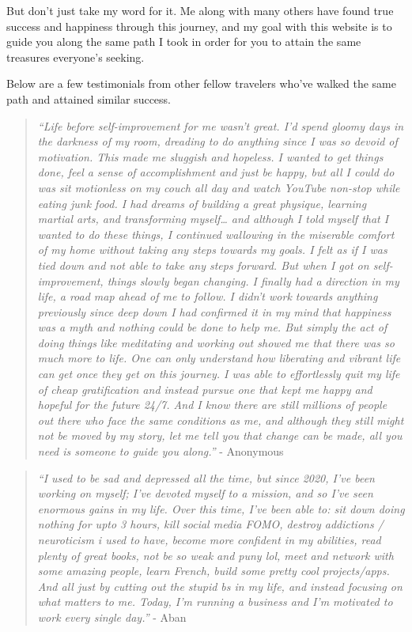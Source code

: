 \documentclass[
]{book}
\begin{document}
But don't just take my word for it. Me along with many others have found true success and happiness through this journey, and my goal with this website is to guide you along the same path I took in order for you to attain the same treasures everyone's seeking.

Below are a few testimonials from other fellow travelers who've walked the same path and attained similar success.

\begin{quote}
\emph{``Life before self-improvement for me wasn't great. I'd spend gloomy days in the darkness of my room, dreading to do anything since I was so devoid of motivation. This made me sluggish and hopeless. I wanted to get things done, feel a sense of accomplishment and just be happy, but all I could do was sit motionless on my couch all day and watch YouTube non-stop while eating junk food. I had dreams of building a great physique, learning martial arts, and transforming myself\ldots{} and although I told myself that I wanted to do these things, I continued wallowing in the miserable comfort of my home without taking any steps towards my goals. I felt as if I was tied down and not able to take any steps forward.
But when I got on self-improvement, things slowly began changing. I finally had a direction in my life, a road map ahead of me to follow. I didn't work towards anything previously since deep down I had confirmed it in my mind that happiness was a myth and nothing could be done to help me. But simply the act of doing things like meditating and working out showed me that there was so much more to life. One can only understand how liberating and vibrant life can get once they get on this journey. I was able to effortlessly quit my life of cheap gratification and instead pursue one that kept me happy and hopeful for the future 24/7. And I know there are still millions of people out there who face the same conditions as me, and although they still might not be moved by my story, let me tell you that change can be made, all you need is someone to guide you along.''} - Anonymous
\end{quote}

\begin{quote}
\emph{``I used to be sad and depressed all the time, but since 2020, I've been working on myself; I've devoted myself to a mission, and so I've seen enormous gains in my life. Over this time, I've been able to: sit down doing nothing for upto 3 hours, kill social media FOMO, destroy addictions / neuroticism i used to have, become more confident in my abilities, read plenty of great books, not be so weak and puny lol, meet and network with some amazing people, learn French, build some pretty cool projects/apps.
And all just by cutting out the stupid bs in my life, and instead focusing on what matters to me. Today, I'm running a business and I'm motivated to work every single day.''} - Aban
\end{quote}
\end{document}
